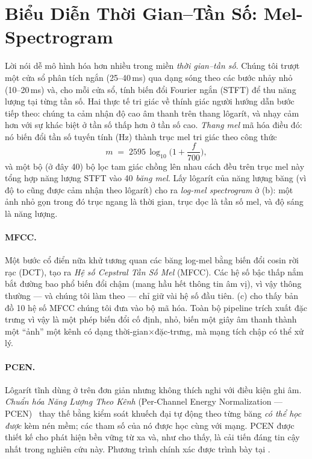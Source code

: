 \documentclass[12pt,a4paper]{report}
\begin{document}
\section{Biểu Diễn Thời Gian--Tần Số: Mel-Spectrogram}\label{sec:mel}

Lời nói dễ mô hình hóa hơn nhiều trong miền \emph{thời gian--tần số}. Chúng tôi
trượt một cửa sổ phân tích ngắn (25--40\,ms) qua dạng sóng theo các bước nhảy nhỏ
(10--20\,ms) và, cho mỗi cửa sổ, tính biến đổi Fourier ngắn (STFT) để thu năng
lượng tại từng tần số. Hai thực tế tri giác về thính giác người hướng dẫn bước
tiếp theo: chúng ta cảm nhận độ cao âm thanh trên thang lôgarít, và nhạy cảm hơn
với sự khác biệt ở tần số thấp hơn ở tần số cao. \emph{Thang mel} mã hóa điều đó:
nó biến đổi tần số tuyến tính (Hz) thành trục mel tri giác theo công thức
\begin{equation}
m \;=\; 2595\,\log_{10}\!\Big(1+\frac{f}{700}\Big),
\label{eq:mel}
\end{equation}
và một bộ (ở đây 40) bộ lọc tam giác chồng lên nhau cách đều trên trục mel này
tổng hợp năng lượng STFT vào 40 \emph{băng mel}. Lấy lôgarít của năng lượng băng
(vì độ to cũng được cảm nhận theo lôgarít) cho ra \emph{log-mel spectrogram} ở
(b): một ảnh nhỏ gọn trong đó trục ngang là thời gian, trục
dọc là tần số mel, và độ sáng là năng lượng.

\paragraph{MFCC.}
Một bước cổ điển nữa khử tương quan các băng log-mel bằng biến đổi cosin rời rạc
(DCT), tạo ra \emph{Hệ số Cepstral Tần Số Mel} (MFCC). Các hệ số bậc thấp nắm
bắt đường bao phổ biến đổi chậm (mang hầu hết thông tin âm vị), vì vậy thông
thường --- và chúng tôi làm theo --- chỉ giữ vài hệ số đầu tiên.
(c) cho thấy bản đồ 10 hệ số MFCC chúng tôi đưa vào bộ mã
hóa. Toàn bộ pipeline trích xuất đặc trưng vì vậy là một phép biến đổi cố định,
nhỏ, biến một giây âm thanh thành một ``ảnh'' một kênh có dạng
thời-gian$\times$đặc-trưng, mà mạng tích chập có thể xử lý.

\paragraph{PCEN.}
Lôgarít tĩnh dùng ở trên đơn giản nhưng không thích nghi với điều kiện ghi âm.
\emph{Chuẩn hóa Năng Lượng Theo Kênh} (Per-Channel Energy Normalization ---
PCEN)~\cite{wang2017trainable} thay thế bằng kiểm soát khuếch đại tự động theo
từng băng \emph{có thể học được} kèm nén mềm; các tham số của nó được học cùng với
mạng. PCEN được thiết kế cho phát hiện bền vững từ xa và, như 
cho thấy, là cải tiến đáng tin cậy nhất trong nghiên cứu này. Phương trình chính
xác được trình bày tại .
\end{document}
